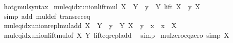 \begin{isabellebody}
\isanewline
{}\isamarkupfalse%
\ hotg{\isacharunderscore}{\kern0pt}mul{\isacharunderscore}{\kern0pt}syntax\isanewline
\isanewline
{}\isamarkupfalse%
\ mul{\isacharunderscore}{\kern0pt}eq{\isacharunderscore}{\kern0pt}idx{\isacharunderscore}{\kern0pt}union{\isacharunderscore}{\kern0pt}lift{\isacharunderscore}{\kern0pt}mul{\isacharcolon}{\kern0pt}\ {\isachardoublequoteopen}X\ {\isacharasterisk}{\kern0pt}\ Y\ {\isacharequal}{\kern0pt}\ {\isacharparenleft}{\kern0pt}{\isasymUnion}y\ {\isasymin}\ Y{\isachardot}{\kern0pt}\ lift\ {\isacharparenleft}{\kern0pt}X\ {\isacharasterisk}{\kern0pt}\ y{\isacharparenright}{\kern0pt}\ X{\isacharparenright}{\kern0pt}{\isachardoublequoteclose}\isanewline
%
\isadelimproof
\ \ %
\endisadelimproof
%
\isatagproof
{}\isamarkupfalse%
\ {\isacharparenleft}{\kern0pt}simp\ add{\isacharcolon}{\kern0pt}\ mul{\isacharunderscore}{\kern0pt}def\ transrec{\isacharunderscore}{\kern0pt}eq{\isacharparenright}{\kern0pt}%
\endisatagproof
{\isafoldproof}%
%
\isadelimproof
\isanewline
%
\endisadelimproof
\isanewline
{}\isamarkupfalse%
\ mul{\isacharunderscore}{\kern0pt}eq{\isacharunderscore}{\kern0pt}idx{\isacharunderscore}{\kern0pt}union{\isacharunderscore}{\kern0pt}repl{\isacharunderscore}{\kern0pt}mul{\isacharunderscore}{\kern0pt}add{\isacharcolon}{\kern0pt}\ {\isachardoublequoteopen}X\ {\isacharasterisk}{\kern0pt}\ Y\ {\isacharequal}{\kern0pt}\ {\isacharparenleft}{\kern0pt}{\isasymUnion}y\ {\isasymin}\ Y{\isachardot}{\kern0pt}\ {\isacharbraceleft}{\kern0pt}X\ {\isacharasterisk}{\kern0pt}\ y\ {\isacharplus}{\kern0pt}\ x\ {\isacharbar}{\kern0pt}\ x\ {\isasymin}\ X{\isacharbraceright}{\kern0pt}{\isacharparenright}{\kern0pt}{\isachardoublequoteclose}\isanewline
%
\isadelimproof
\ \ %
\endisadelimproof
%
\isatagproof
{}\isamarkupfalse%
\ mul{\isacharunderscore}{\kern0pt}eq{\isacharunderscore}{\kern0pt}idx{\isacharunderscore}{\kern0pt}union{\isacharunderscore}{\kern0pt}lift{\isacharunderscore}{\kern0pt}mul{\isacharbrackleft}{\kern0pt}of\ X\ Y{\isacharbrackright}{\kern0pt}\ lift{\isacharunderscore}{\kern0pt}eq{\isacharunderscore}{\kern0pt}repl{\isacharunderscore}{\kern0pt}add\ \isamarkupfalse%
\ simp%
\endisatagproof
{\isafoldproof}%
%
\isadelimproof
%
\endisadelimproof
%
\isadelimdocument
%
\endisadelimdocument
%
\isatagdocument
%
\isamarkuptrue%
%
\endisatagdocument
{\isafolddocument}%
%
\isadelimdocument
%
\endisadelimdocument
{}\isamarkupfalse%
\ mul{\isacharunderscore}{\kern0pt}zero{\isacharunderscore}{\kern0pt}eq{\isacharunderscore}{\kern0pt}zero\ {\isacharbrackleft}{\kern0pt}simp{\isacharbrackright}{\kern0pt}{\isacharcolon}{\kern0pt}\ {\isachardoublequoteopen}X\ {\isacharasterisk}{\kern0pt}\ {}\ {\isacharequal}{\kern0pt}\ {}{\isachardoublequoteclose}\isanewline

\end{isabellebody}

